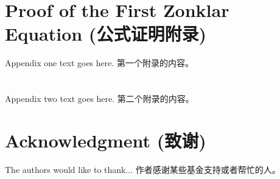 \documentclass[journal]{IEEEtran}
\begin{document}
\appendices
\section{Proof of the First Zonklar Equation (公式证明附录)}
Appendix one text goes here. 第一个附录的内容。

\section{} %
Appendix two text goes here. 第二个附录的内容。

\section*{Acknowledgment (致谢)}
The authors would like to thank... 作者感谢某些基金支持或者帮忙的人。

\ifCLASSOPTIONcaptionsoff
  \newpage
\fi

\newpage


\end{document}
